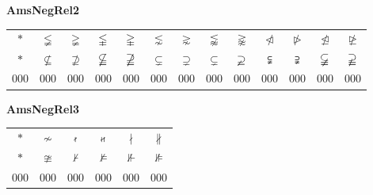 \documentclass[12pt]{report}
\newlength{\mine}
\newlength{\niz}
\def\pmb{}
\begin{document}
\textbf{AmsNegRel2}
\par\nobreak\vspace{2mm}
\begin{tabular}{|c|cccccccccccc|}
  \hline
   $\pmb *$&
   $\pmb\lneqq $&
   $\pmb\gneqq $&
   $\pmb\lvertneqq $&
   $\pmb\gvertneqq $&
   $\pmb\lnsim $&
   $\pmb\gnsim $&
   $\pmb\lnapprox $&
   $\pmb\gnapprox $&
   $\pmb\ntriangleleft $&
   $\pmb\ntriangleright $&
   $\pmb\ntrianglelefteq $&
   $\pmb\ntrianglerighteq $\\[\mine]
   $\pmb *$&
   $\pmb\nsubseteq $&
   $\pmb\nsupseteq $&
   $\pmb\nsubseteqq $&
   $\pmb\nsupseteqq $&
   $\pmb\subsetneq $&
   $\pmb\supsetneq $&
   $\pmb\varsubsetneq $&
   $\pmb\varsupsetneq $&
   $\pmb\subsetneqq $&
   $\pmb\supsetneqq $&
   $\pmb\varsubsetneqq $&
   $\pmb\varsupsetneqq $\\[\niz]
  \hline\hline
  000&000&000&000&000&000&000&000&000&000&000&000&000\\
  \hline
\end{tabular}
\goodbreak\par\vspace{3mm}

\textbf{AmsNegRel3}
\par\nobreak\vspace{2mm}
\begin{tabular}{|c|ccccc|}
  \hline
   $\pmb *$&
   $\pmb\nsim $&
   $\pmb\nshortmid $&
   $\pmb\nshortparallel $&
   $\pmb\nmid $&
   $\pmb\nparallel $\\[\mine]
   $\pmb *$&
   $\pmb\ncong $&
   $\pmb\nvdash $&
   $\pmb\nvDash $&
   $\pmb\nVdash $&
   $\pmb\nVDash $\\[\niz]
  \hline\hline
  000&000&000&000&000&000\\
  \hline
\end{tabular}
\goodbreak\par\vspace{3mm}
\end{document}
